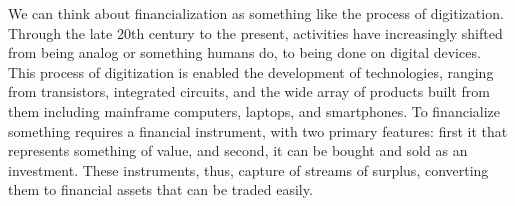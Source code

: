 We can think about financialization as something like the process of \gls{digitization}. 
Through the late 20th century to the present, activities have increasingly shifted from being analog or something humans do, to being done on digital devices. This process of digitization is enabled the development of technologies, ranging from  transistors, integrated circuits, and the wide array of products built from them including mainframe computers, laptops, and smartphones.  
To financialize something requires a \gls{financial instrument}, with two primary features: first it that represents something of value, and second, it can be bought and sold as an investment. These instruments, thus, capture of streams of surplus, converting them to financial assets that can be traded easily. 

